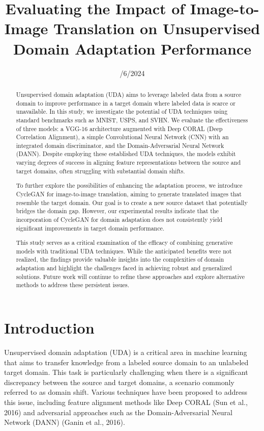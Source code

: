 \documentclass[conference]{IEEEtran}
\title{Evaluating the Impact of Image-to-Image Translation on Unsupervised Domain Adaptation Performance}
\author{
        \IEEEauthorblockN{Stathopoulos Dimitris}
        \IEEEauthorblockA{
                AUEB Msc In Data Science \\
                Email: dim.stathopoulos@aueb.gr
        }
}
\date{\25/6/2024}
\begin{document}
\maketitle
\begin{abstract}
Unsupervised domain adaptation (UDA) aims to leverage labeled data from a source domain to improve performance in a target domain where labeled data is scarce or unavailable. In this study, we investigate the potential of UDA techniques using standard benchmarks such as MNIST, USPS, and SVHN. We evaluate the effectiveness of three models: a VGG-16 architecture augmented with Deep CORAL (Deep Correlation Alignment), a simple Convolutional Neural Network (CNN) with an integrated domain discriminator, and the Domain-Adversarial Neural Network (DANN). Despite employing these established UDA techniques, the models exhibit varying degrees of success in aligning feature representations between the source and target domains, often struggling with substantial domain shifts.

To further explore the possibilities of enhancing the adaptation process, we introduce CycleGAN for image-to-image translation, aiming to generate translated images that resemble the target domain. Our goal is to create a new source dataset that potentially bridges the domain gap. However, our experimental results indicate that the incorporation of CycleGAN for domain adaptation does not consistently yield significant improvements in target domain performance.

This study serves as a critical examination of the efficacy of combining generative models with traditional UDA techniques. While the anticipated benefits were not realized, the findings provide valuable insights into the complexities of domain adaptation and highlight the challenges faced in achieving robust and generalized solutions. Future work will continue to refine these approaches and explore alternative methods to address these persistent issues.
\end{abstract}

\section{Introduction}
Unsupervised domain adaptation (UDA) is a critical area in machine learning that aims to transfer knowledge from a labeled source domain to an unlabeled target domain. This task is particularly challenging when there is a significant discrepancy between the source and target domains, a scenario commonly referred to as domain shift. Various techniques have been proposed to address this issue, including feature alignment methods like Deep CORAL (Sun et al., 2016) and adversarial approaches such as the Domain-Adversarial Neural Network (DANN) (Ganin et al., 2016).
\end{document}
